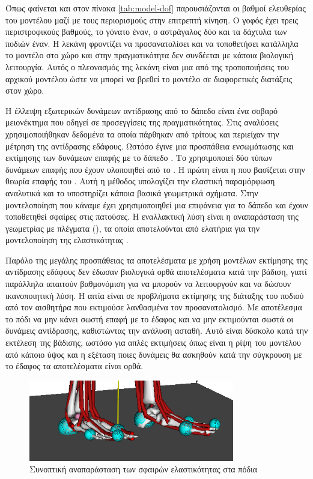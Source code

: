 Όπως φαίνεται και στον πίνακα \ref{tab:model-dof} παρουσιάζονται οι βαθμοί ελευθερίας του μοντέλου μαζί με τους περιορισμούς στην επιτρεπτή κίνηση. Ο γοφός έχει τρεις περιστροφικούς βαθμούς, το γόνατο έναν, ο αστράγαλος δύο και τα δάχτυλα των ποδιών έναν. Η λεκάνη φροντίζει να προσανατολίσει και να τοποθετήσει κατάλληλα το μοντέλο στο χώρο και στην πραγματικότητα δεν συνδέεται με κάποια βιολογική λειτουργία. Αυτός ο πλεονασμός της λεκάνη είναι μια από της τροποποιήσεις του αρχικού μοντέλου ώστε να μπορεί να βρεθεί το μοντέλο σε διαφορετικές διατάξεις στον χώρο.

Η έλλειψη εξωτερικών δυνάμεων αντίδρασης από το δάπεδο είναι ένα σοβαρό μειονέκτημα που οδηγεί σε προσεγγίσεις της πραγματικότητας. Στις αναλύσεις χρησιμοποιήθηκαν δεδομένα τα οποία πάρθηκαν από τρίτους και περιείχαν την μέτρηση της αντίδρασης εδάφους. Ωστόσο έγινε μια προσπάθεια ενσωμάτωσης και εκτίμησης των δυνάμεων επαφής με το δάπεδο \cite{seitha11}. Το  χρησιμοποιεί δύο τύπων δυνάμεων επαφής που έχουν υλοποιηθεί από το . Η πρώτη είναι η  που βασίζεται στην θεωρία επαφής του  \cite{hunt75}. Αυτή η μέθοδος υπολογίζει την ελαστική παραμόρφωση αναλυτικά και το  υποστηρίζει κάποια βασικά γεωμετρικά σχήματα. Στην μοντελοποίηση που κάναμε έχει χρησιμοποιηθεί μια επιφάνεια για το δάπεδο και έχουν τοποθετηθεί σφαίρες στις πατούσες. Η εναλλακτική λύση είναι η αναπαράσταση της γεωμετρίας με πλέγματα (), τα οποία αποτελούνται από ελατήρια για την μοντελοποίηση της ελαστικότητας \cite{hertz82}. 

Παρόλο της μεγάλης προσπάθειας τα αποτελέσματα με χρήση μοντέλων εκτίμησης της αντίδρασης εδάφους δεν έδωσαν βιολογικά ορθά αποτελέσματα κατά την βάδιση, γιατί παράλληλα απαιτούν βαθμονόμιση για να μπορούν να λειτουργούν και να δώσουν ικανοποιητική λύση. Η αιτία είναι σε προβλήματα εκτίμησης της διάταξης του ποδιού από τον αισθητήρα που εκτιμούσε λανθασμένα τον προσανατολισμό. Με αποτέλεσμα το πόδι να μην κάνει σωστή επαφή με το έδαφος και να μην εκτιμούνται σωστά οι δυνάμεις αντίδρασης, καθιστώντας την ανάλυση ασταθή. Αυτό είναι δύσκολο κατά την εκτέλεση της βάδισης, ωστόσο για απλές εκτιμήσεις όπως είναι η ρίψη του μοντέλου από κάποιο ύψος και η εξέταση ποιες δυνάμεις θα ασκηθούν κατά την σύγκρουση με το έδαφος τα αποτελέσματα είναι ορθά. 

\begin{figure}[H]
    \centering
    \includegraphics[width=0.8\textwidth, keepaspectratio]{fig/foot-contact.png}
    \caption{Συνοπτική αναπαράσταση των σφαιρών ελαστικότητας στα πόδια}
    \label{fig:foot-contact}
\end{figure}

